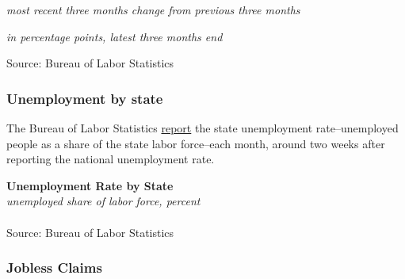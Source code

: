 \documentclass{report}
\begin{document}
{{{{{{{{{\begin{minipage}{0.76\textwidth}
\footnotesize{\textit{most recent three months change from previous three months}}

\footnotesize{\textit{in percentage points, latest three months end }}

\vspace{-2mm}

\hspace*{-15mm} 

\vspace{-2mm}

\footnotesize{Source: Bureau of Labor Statistics}

\end{minipage}

\newpage
\subsubsection*{\color{black!70} \seriffont Unemployment by state}
\begin{minipage}{0.76\textwidth}
\small The Bureau of Labor Statistics \href{https://www.bls.gov/lau/}{report} the state unemployment rate--unemployed people as a share of the state labor force--each month, around two weeks after reporting the national unemployment rate. 
\end{minipage}

\vspace{3mm}

\normalsize \textbf{Unemployment Rate by State}\\
\footnotesize{\textit{unemployed share of labor force, percent}}\\
\vspace{-2mm}
\hspace{-8mm}  \\
\footnotesize{Source: Bureau of Labor Statistics}

\newpage
\begin{minipage}{0.76\textwidth}
\subsubsection*{\color{black!70} \seriffont Jobless Claims}

\small \\


\end{minipage}
\vspace{1mm}

}}}}}}}}}
\end{document}
